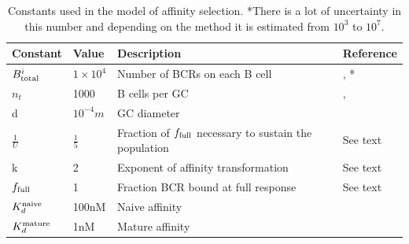 \begin{table}[ht]
\centering
\begin{tabular}{llll}
Constant    & Value & Description & Reference \\ \hline
$B^i_{\text{total}}$ & $1\times10^{4}$     & Number of BCRs on each B cell & \cite{immprot}, \cite{rieckmann2017social}*     \\
$n_t$ & 1000 & B cells per GC &  \cite{kroese1990germinal}, \cite{Childs_Baskerville_Cobey_2015} \\
d & $10^{-4} m$ & GC diameter &  \cite{Romppanen_1981} \\
$\frac{1}{U}$           & $\frac{1}{5}$     & Fraction of $f_{\text{full}}$ necessary to sustain the population & See text \\
k           & 2     & Exponent of affinity transformation & See text  \\
$f_{\text{full}}$  & 1     & Fraction BCR bound at full response & See text \\
$K_d^{\text{naive}}$ & 100nM & Naive affinity & \cite{berek1987mutation} \\
$K_d^{\text{mature}}$ & 1nM & Mature affinity & \cite{berek1987mutation} \\
\end{tabular}
\caption{
\label{constants}
    Constants used in the model of affinity selection. *There is a lot of uncertainty in this number and depending on the method it is estimated from $10^3$ to $10^7$.}
\end{table}









